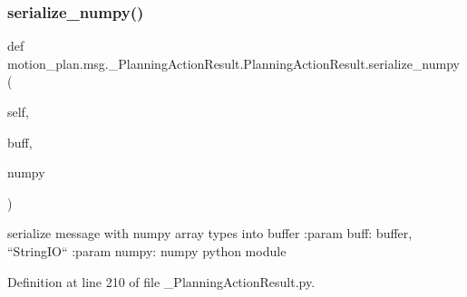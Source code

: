\subsubsection{\texorpdfstring{serialize\+\_\+numpy()}{serialize\_numpy()}}
{\footnotesize\ttfamily def motion\+\_\+plan.\+msg.\+\_\+\+Planning\+Action\+Result.\+Planning\+Action\+Result.\+serialize\+\_\+numpy (\begin{DoxyParamCaption}\item[{}]{self,  }\item[{}]{buff,  }\item[{}]{numpy }\end{DoxyParamCaption})}

\begin{DoxyVerb}serialize message with numpy array types into buffer
:param buff: buffer, ``StringIO``
:param numpy: numpy python module
\end{DoxyVerb}
 

Definition at line 210 of file \+\_\+\+Planning\+Action\+Result.\+py.


